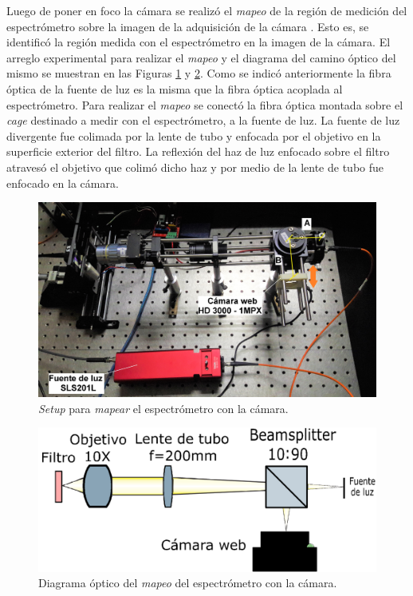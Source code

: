 Luego de poner en foco la cámara se realizó el \textit{mapeo} de la región de medición del espectrómetro sobre la imagen de la adquisición de la cámara \cite{frise}. Esto es, se identificó la región medida con el espectrómetro en la imagen de la cámara. El arreglo experimental para realizar el \textit{mapeo} y el diagrama del camino óptico del mismo se muestran en las Figuras \ref{fig:modmanualcam} y \ref{fig:caminmapp}. Como se indicó anteriormente la fibra óptica de la fuente de luz es la misma que la fibra óptica acoplada al espectrómetro. Para realizar el \textit{mapeo} se conectó la fibra óptica montada sobre el \textit{cage} destinado a medir con el espectrómetro, a la fuente de luz. La fuente de luz divergente fue colimada por la lente de tubo y enfocada por el objetivo en la superficie exterior del filtro. La reflexión del haz de luz enfocado sobre el filtro atravesó el objetivo que colimó dicho haz y por medio de la lente de tubo fue enfocado en la cámara.

\begin{figure}[H]
	\centering
	\includegraphics[width=1.0\textwidth]{Figs/microespectrometro/mapespeccam.jpg}
	\caption{\textit{Setup} para \textit{mapear} el espectrómetro con la cámara.}
	\label{fig:modmanualcam}
\end{figure}

\begin{figure}[H]
	\centering
	\includegraphics[width=1.0\textwidth]{Figs/microespectrometro/diagopticomapcamspec.png}
	\caption{Diagrama óptico del \textit{mapeo} del espectrómetro con la cámara.}
	\label{fig:caminmapp}
\end{figure}

